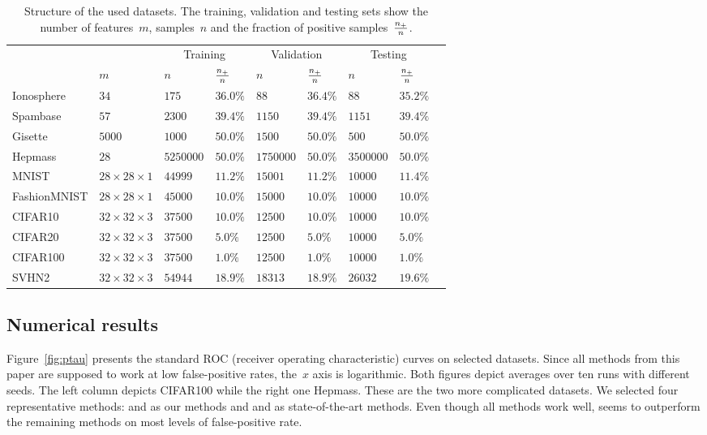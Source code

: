 \begin{table}[!ht]
  \centering
  \begin{tabular}{@{}lllllllll@{}}
    \toprule
    &  & \multicolumn{2}{c}{Training} & \multicolumn{2}{c}{Validation} & \multicolumn{2}{c}{Testing} \\ \cmidrule(lr){3-4} \cmidrule(lr){5-6} \cmidrule(l){7-8} 
    & $m$ & $n$ & $\frac{n_{+}}{n}$ & $n$ & $\frac{n_{+}}{n}$ & $n$ & $\frac{n_{+}}{n}$ \\ \midrule
    Ionosphere
      & $34$
      & $175$ & $36.0\%$ & $88$ & $36.4\%$ & $88$ & $35.2\%$ \\
    Spambase
      & $57$
      & $2300$ & $39.4\%$ & $1150$ & $39.4\%$ & $1151$ & $39.4\%$ \\
    Gisette
      & $5000$
      & $1000$ & $50.0\%$ & $1500$ & $50.0\%$ & $500$ & $50.0\%$ \\
    Hepmass
      & $28$
      & $5250000$ & $50.0\%$ & $1750000$ & $50.0\%$ & $3500000$ & $50.0\%$ \\
    MNIST
      & $28 \times 28 \times 1$
      & $44999$ & $11.2\%$ & $15001$ & $11.2\%$ & $10000$ & $11.4\%$ \\
    FashionMNIST
      & $28 \times 28\times 1$
      & $45000$ & $10.0\%$ & $15000$ & $10.0\%$ & $10000$ & $10.0\%$ \\
    CIFAR10
      & $32\times 32\times 3$
      & $37500$ & $10.0\%$ & $12500$ & $10.0\%$ & $10000$ & $10.0\%$ \\
    CIFAR20
      & $32 \times 32\times 3$
      & $37500$ & $5.0\%$ & $12500$ & $5.0\%$ & $10000$ & $5.0\%$ \\
    CIFAR100
      & $32 \times 32\times 3$
      & $37500$ & $1.0\%$ & $12500$ & $1.0\%$ & $10000$ & $1.0\%$ \\
    SVHN2
      & $32 \times 32\times 3$
      & $54944$ & $18.9\%$ & $18313$ & $18.9\%$ & $26032$ & $19.6\%$ \\
    \bottomrule
  \end{tabular}
  \caption{Structure of the used datasets. The training, validation and testing sets show the number of features~$m$, samples~$n$ and the fraction of positive samples~$\frac{n_{+}}{n}$.}
  \label{tab:counts}
\end{table}

\subsection{Numerical results}

Figure~\ref{fig:ptau} presents the standard ROC (receiver operating characteristic) curves on selected datasets. Since all methods from this paper are supposed to work at low false-positive rates, the~$x$ axis is logarithmic. Both figures depict averages over ten runs with different seeds. The left column depicts CIFAR100 while the right one Hepmass. These are the two more complicated datasets. We selected four representative methods: \PatMat and \PatMatNP as our methods and \TopPush and \tauFPL as state-of-the-art methods. Even though all methods work well, \PatMatNP seems to outperform the remaining methods on most levels of false-positive rate.

